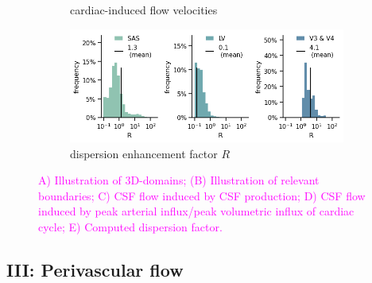 \documentclass[fleqn,10pt]{wlscirep}
\newcommand{\mer}[1]{\textcolor{magenta}{#1}}
\newcommand{\draft}[1]{\textcolor{gray}{#1}}
\begin{document}
\begin{figure}[h!]
\begin{subfigure}[b]{0.33\textwidth}
\caption{cardiac-induced flow velocities}
\label{fig:csf_flow_histo_cardiac}
\end{subfigure}
\begin{subfigure}[b]{0.33\textwidth}
\includegraphics[width = 1 \textwidth]{figures/R_histo.png} 
\caption{dispersion enhancement factor $R$}
\label{fig:csf_flow_histo_R}
\end{subfigure}
\caption{\mer{A) Illustration of 3D-domains; (B) Illustration of
    relevant boundaries; C) CSF flow induced by CSF production; D) CSF
    flow induced by peak arterial influx/peak volumetric influx of
    cardiac cycle; E) Computed dispersion factor.}}
\label{fig:csf}
\end{figure}  

\subsection*{III: Perivascular flow}

\draft{\lipsum[1]}
\end{document}
